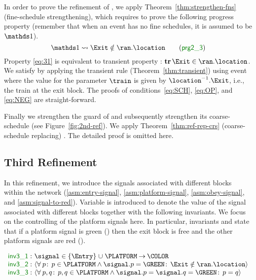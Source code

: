 In order to prove the refinement of \moveout, we apply
Theorem~\ref{thm:strengthen-fns} (fine-schedule strengthening), which
requires to prove the following progress property (remember that when
an event has no fine schedules, it is assumed to be $\one$).
\begin{equation}
  \label{eq:31}
  \one \leadsto \Exit \notin \ran.\location
  \tag{\Binv{prg2\_3}}
\end{equation}
Property
\ref{eq:31} is equivalent to transient property : $\tr
\Exit \in \ran.\location$.  We satisfy  by applying the
transient rule (Theorem~\ref{thm:transient}) using event \depart where
the value for the parameter $\train$ is given by
$\location^{-1}.\Exit$, i.e., the train at the exit block.  The
proofs of conditions~\ref{eq:SCH}, \ref{eq:OP}, and \ref{eq:NEG} are
straight-forward.

Finally we strengthen the guard of \movein and subsequently strengthen
its coarse-schedule (see Figure~\ref{fig:2nd-ref}).  We apply
Theorem~\ref{thm:ref-rep-crs} (coarse-schedule replacing) \movein.
The detailed proof is omitted here.

\subsection{Third Refinement}
\label{sec:third-refinement}


In this refinement, we introduce the signals associated with different
blocks within the network (\ref{asm:entry-signal},
\ref{asm:platform-signal}, \ref{asm:obey-signal}, and
\ref{asm:signal-to-red}).  Variable \signal is introduced to denote
the value of the signal associated with different blocks together with
the following invariants.  We focus on the controlling of the platform
signals here.  In particular, invariants  and
 state that if a platform signal is green (\GREEN) then
the exit block is free and the other platform signals are red (\RED).
  \begin{Bcode}[\footnotesize]
    $ \invariants[false]{ \Binv{inv3\_1}: & \signal \in \{\Entry\}
      \bunion \PLATFORM \tfun
      \COLOR \\
      \Binv{inv3\_2}: & \qforall{p}{p \in \PLATFORM \land \signal.p =
        \GREEN}{\Exit \notin \ran.\location} \\
      \Binv{inv3\_3}: & \qforall{p,q}{p, q \in \PLATFORM \land
        \signal.p = \signal.q = \GREEN}{p = q} } $
  \end{Bcode}

